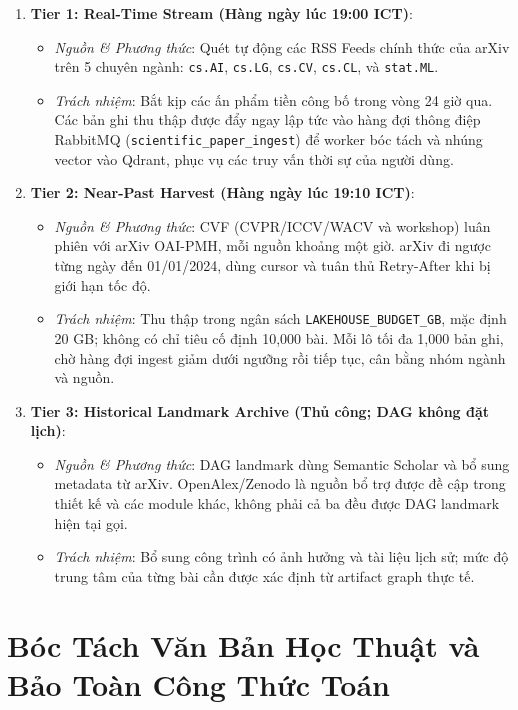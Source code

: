 \begin{enumerate}[label=\textbf{\arabic*.}]
  \item \textbf{Tier 1: Real-Time Stream (Hàng ngày lúc 19:00 ICT)}:
    \begin{itemize}
      \item \textit{Nguồn \& Phương thức}: Quét tự động các RSS Feeds chính thức của arXiv trên 5 chuyên ngành: \texttt{cs.AI}, \texttt{cs.LG}, \texttt{cs.CV}, \texttt{cs.CL}, và \texttt{stat.ML}.
      \item \textit{Trách nhiệm}: Bắt kịp các ấn phẩm tiền công bố trong vòng 24 giờ qua. Các bản ghi thu thập được đẩy ngay lập tức vào hàng đợi thông điệp RabbitMQ (\texttt{scientific\_paper\_ingest}) để worker bóc tách và nhúng vector vào Qdrant, phục vụ các truy vấn thời sự của người dùng.
    \end{itemize}
  \item \textbf{Tier 2: Near-Past Harvest (Hàng ngày lúc 19:10 ICT)}:
    \begin{itemize}
      \item \textit{Nguồn \& Phương thức}: CVF (CVPR/ICCV/WACV và workshop) luân phiên với arXiv OAI-PMH, mỗi nguồn khoảng một giờ. arXiv đi ngược từng ngày đến 01/01/2024, dùng cursor và tuân thủ Retry-After khi bị giới hạn tốc độ.
      \item \textit{Trách nhiệm}: Thu thập trong ngân sách \texttt{LAKEHOUSE\_BUDGET\_GB}, mặc định 20 GB; không có chỉ tiêu cố định 10,000 bài. Mỗi lô tối đa 1,000 bản ghi, chờ hàng đợi ingest giảm dưới ngưỡng rồi tiếp tục, cân bằng nhóm ngành và nguồn.
    \end{itemize}
  \item \textbf{Tier 3: Historical Landmark Archive (Thủ công; DAG không đặt lịch)}:
    \begin{itemize}
      \item \textit{Nguồn \& Phương thức}: DAG landmark dùng Semantic Scholar và bổ sung metadata từ arXiv. OpenAlex/Zenodo là nguồn bổ trợ được đề cập trong thiết kế và các module khác, không phải cả ba đều được DAG landmark hiện tại gọi.
      \item \textit{Trách nhiệm}: Bổ sung công trình có ảnh hưởng và tài liệu lịch sử; mức độ trung tâm của từng bài cần được xác định từ artifact graph thực tế.
    \end{itemize}
\end{enumerate}

\section{Bóc Tách Văn Bản Học Thuật và Bảo Toàn Công Thức Toán}


